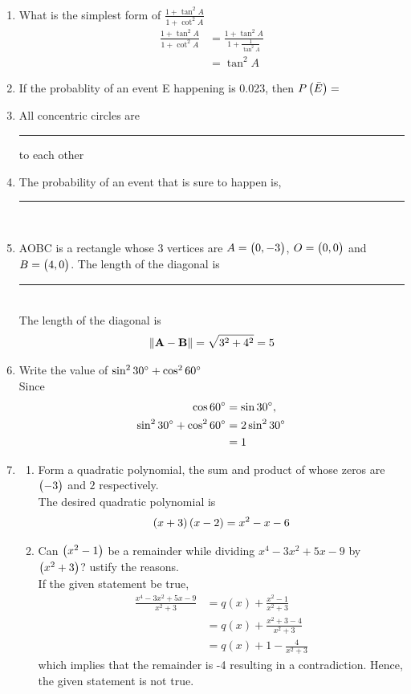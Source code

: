\documentclass[journal,12pt,twocolumn]{IEEEtran}
\begin{document}
\begin{enumerate}[label=2.\arabic*]
\item What is the simplest form of $\frac{1 + \tan^2 A}{1 + \cot^2 A}$\\
	\solution
		\begin{align}
			\frac{1 + \tan^2 A}{1 + \cot^2 A} 
			&=\frac{1 + \tan^2 A}{1 + \frac{1}{\tan^2 A}} 
			\\
			&=\tan^2 A
		\end{align}
	\item If the probablity of an event E happening is 0.023, then $P\left(\bar{E}\right) = $\\
\item All concentric circles are \rule{1.5cm}{0.15mm} to each other\\

\item The probability of an event that is sure to happen is, \rule{1.5cm}{0.15mm}\\

\item AOBC is a rectangle whose 3 vertices are $A = \begin{pmatrix}0,-3\end{pmatrix}$, $O = \begin{pmatrix}0,0\end{pmatrix}$ and $B = \begin{pmatrix}4,0\end{pmatrix}$. The length of the diagonal is \rule{1.5cm}{0.15mm}\\
\solution
The length of the diagonal is  
  \begin{align}
	  \left\lVert\mathbf{A}-\mathbf{B}\right\rVert = \sqrt{3^2+4^2} = 5
  \end{align}

\item Write the value of $\sin^2 30\degree + \cos^2 60\degree$\\
	\solution Since 
  \begin{align}
	  \cos 60\degree &= \sin 30\degree, 
	  \\
	  \sin^2 30\degree + \cos^2 60\degree &= 
2\sin^2 30\degree 
\\
	  &=1
  \end{align}


\item \begin{enumerate}
    \item Form a quadratic polynomial, the sum and product of whose zeros are $\begin{pmatrix}-3\end{pmatrix}$ and $2$ respectively.\\
	    \solution  The desired quadratic polynomial is 
  \begin{align}
	  \left(x+3\right)\left(x-2\right) = x^2-x-6
  \end{align}
    \item Can $\begin{pmatrix}x^2 - 1\end{pmatrix}$ be a remainder while dividing $x^4 - 3x^2 + 5x - 9$ by $\begin{pmatrix}x^2 + 3\end{pmatrix}$? ustify the reasons.\\
	    \solution  If the given statement be true, 
  \begin{align}
	  \frac{x^4 - 3x^2 + 5x - 9}{x^2 + 3} &= q(x) +\frac{ x^2 - 1}{x^2+3}
	  \\
	  &= q(x) +\frac{ x^2 +3 - 4}{x^2+3}
	  \\
	  &=q(x) + 1 - \frac{4}{x^2+3} 
  \end{align}
  which implies that the remainder is -4 resulting in a contradiction.  Hence, the given statement is not true.
\end{enumerate}


\end{enumerate}
\end{document}
